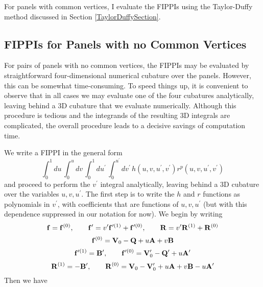\documentclass[dvips,letterpaper]{article}
\begin{document}
For panels with common vertices, I evaluate the FIPPIs 
using the Taylor-Duffy method discussed in 
Section \ref{TaylorDuffySection}.

\subsection{FIPPIs for Panels with no Common Vertices}

For pairs of panels with no common vertices, the FIPPIs may be 
evaluated by straightforward four-dimensional numerical cubature 
over the panels. However, this can be somewhat time-consuming.
To speed things up, it is convenient to observe that in all cases
we may evaluate one of the four cubatures analytically, leaving
behind a 3D cubature that we evaluate numerically.
Although this procedure is tedious and the integrands of the 
resulting 3D integrals are complicated, the overall procedure 
leads to a decisive savings of computation time.

We write a FIPPI in the general form
$$ \int_0^1 du \, \int_0^u dv \, 
   \int_0^1 du^\prime \, \int_0^{u^\prime} dv^\prime \,
   h(u, v, u^\prime, v^\prime) r^p(u, v, u^\prime, v^\prime)
$$
and proceed to perform the $v^\prime$ integral analytically,
leaving behind a 3D cubature over the variables $u,v,u^\prime.$
The first step is to write the $h$ and $r$ functions
as polynomials in $v^\prime$, with coefficients that are
functions of $u,v,u^\prime$ (but with this dependence suppressed
in our notation for now). We begin by writing 
$$ \mathbf{f} = \mathbf{f}^{(0)}, 
   \qquad
   \mathbf{f}^\prime = v^\prime \mathbf{f}^{\prime(1)} + \mathbf{f}^{\prime(0)},
   \qquad
   \mathbf{R} = v^\prime \mathbf{R}^{(1)} + \mathbf{R}^{(0)}
$$
$$ \mathbf{f}^{(0)} = \mathbf{V}_0 - \mathbf{Q} + u\mathbf{A} + v\mathbf{B}$$
$$ \mathbf{f}^{\prime(1)} = \mathbf{B}^\prime, 
   \qquad 
   \mathbf{f}^{\prime(0)} = \mathbf{V}_0^\prime - \mathbf{Q}^\prime + u\mathbf{A}^\prime 
$$
$$ \mathbf{R}^{(1)} = -\mathbf{B}^\prime, 
   \qquad
   \mathbf{R}^{(0)} = \mathbf{V}_0 - \mathbf{V}_0^\prime + u\mathbf{A} + v\mathbf{B} - u\mathbf{A}^\prime
$$
Then we have 
\end{document}
